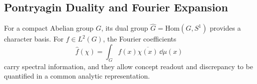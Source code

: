 \subsection{Pontryagin Duality and Fourier Expansion}

For a compact Abelian group $G$, its dual group $\widehat G=\mathrm{Hom}(G,S^1)$ provides a character basis. For $f\in L^2(G)$, the Fourier coefficients
\[
\widehat f(\chi)=\int_G f(x)\overline{\chi(x)}\,\dd\mu(x)
\]
carry spectral information, and they allow concept readout and discrepancy to be quantified in a common analytic representation.
